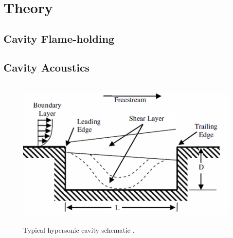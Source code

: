 
\chapter{Theory} %

\label{Chapter2} %



\section{Cavity Flame-holding}





\section{Cavity Acoustics}







\begin{figure}
\centering
\includegraphics[height=3in]{Figures/CavityDiagram.png}
\caption[Diagram of typical cavity]{Typical hypersonic cavity schematic \cite{lazar2008control}.}
\end{figure}